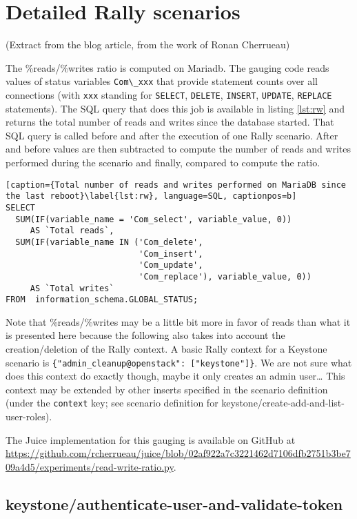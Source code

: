 

\section{Detailed Rally scenarios}
\label{sec:detail-rally}

(Extract from the blog article, from the work of Ronan Cherrueau)

The \%reads/\%writes ratio is computed on Mariadb. The gauging code reads values of status variables \verb+Com\_xxx+ that provide statement counts over all connections (with \verb+xxx+ standing for \verb+SELECT+, \verb+DELETE+, \verb+INSERT+, \verb+UPDATE+, \verb+REPLACE+ statements). The SQL query that does this job is available in listing \ref{lst:rw} and returns the total number of reads and writes since the database started. That SQL query is called before and after the execution of one Rally scenario. After and before values are then subtracted to compute the number of reads and writes performed during the scenario and finally, compared to compute the ratio.

\begin{lstlisting}[caption={Total number of reads and writes performed on MariaDB since the last reboot}\label{lst:rw}, language=SQL, captionpos=b]
SELECT
  SUM(IF(variable_name = 'Com_select', variable_value, 0))
     AS `Total reads`,
  SUM(IF(variable_name IN ('Com_delete',
                           'Com_insert',
                           'Com_update',
                           'Com_replace'), variable_value, 0))
     AS `Total writes`
FROM  information_schema.GLOBAL_STATUS;
\end{lstlisting}

Note that \%reads/\%writes may be a little bit more in favor of reads than what it is presented here because the following also takes into account the creation/deletion of the Rally context. A basic Rally context for a Keystone scenario is \verb+{"admin_cleanup@openstack": ["keystone"]}+. We are not sure what does this context do exactly though, maybe it only creates an admin user… This context may be extended by other inserts specified in the scenario definition (under the \verb+context+ key; see scenario definition for keystone/create-add-and-list-user-roles).

The Juice implementation for this gauging is available on GitHub at \url{https://github.com/rcherrueau/juice/blob/02af922a7c3221462d7106dfb2751b3be709a4d5/experiments/read-write-ratio.py}.


\subsection{keystone/authenticate-user-and-validate-token}

